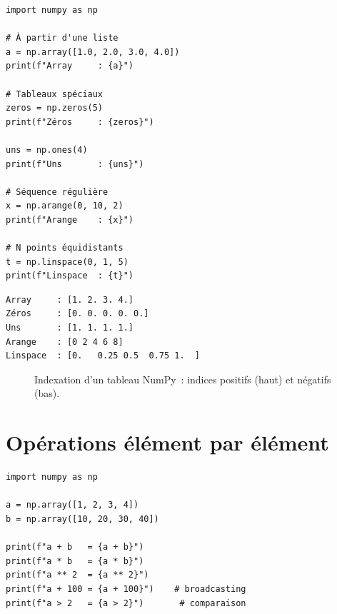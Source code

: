 \begin{codeblock}[title=\textbf{Python}]
\begin{verbatim}
import numpy as np

# À partir d'une liste
a = np.array([1.0, 2.0, 3.0, 4.0])
print(f"Array     : {a}")

# Tableaux spéciaux
zeros = np.zeros(5)
print(f"Zéros     : {zeros}")

uns = np.ones(4)
print(f"Uns       : {uns}")

# Séquence régulière
x = np.arange(0, 10, 2)
print(f"Arange    : {x}")

# N points équidistants
t = np.linspace(0, 1, 5)
print(f"Linspace  : {t}")
\end{verbatim}
\end{codeblock}

\begin{codeoutput}
\begin{verbatim}
Array     : [1. 2. 3. 4.]
Zéros     : [0. 0. 0. 0. 0.]
Uns       : [1. 1. 1. 1.]
Arange    : [0 2 4 6 8]
Linspace  : [0.   0.25 0.5  0.75 1.  ]
\end{verbatim}
\end{codeoutput}

\begin{figure}[ht]
\centering
{}
\caption{Indexation d'un tableau NumPy~: indices positifs (haut) et n\'egatifs (bas).}
\label{fig:numpy-indexation}
\end{figure}

\section{Op\'erations \'el\'ement par \'el\'ement}

\begin{codeblock}[title=\textbf{Python}]
\begin{verbatim}
import numpy as np

a = np.array([1, 2, 3, 4])
b = np.array([10, 20, 30, 40])

print(f"a + b   = {a + b}")
print(f"a * b   = {a * b}")
print(f"a ** 2  = {a ** 2}")
print(f"a + 100 = {a + 100}")    # broadcasting
print(f"a > 2   = {a > 2}")       # comparaison
\end{verbatim}
\end{codeblock}

